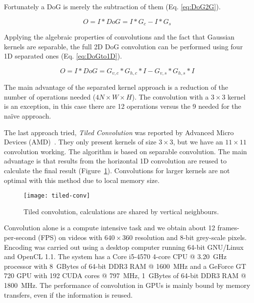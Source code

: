 Fortunately a DoG is merely the subtraction of them (Eq. \ref{eq:DoG2G}).
\vspace*{0.5cm}

\begin{equation}
O = I \ast DoG = I \ast G_{c} - I \ast G_{s}
\label{eq:DoG2G}
\end{equation}

Applying the algebraic properties of convolutions and the fact that Gaussian kernels are separable, the full 2D DoG convolution can be performed using four 1D separated ones (Eq. \ref{eq:DoGto1D}).

\begin{equation}
O = I \ast DoG = G_{v,c} \ast G_{h,c} \ast I - G_{v,s} \ast G_{h,s} \ast I 
\label{eq:DoGto1D}
\end{equation}

The main advantage of the separated kernel approach is a reduction of the number of operations needed ($4N\times W \times H$). The convolution with a $3\times 3$ kernel is an exception, in this case there are 12 operations versus the 9 needed for the naïve approach.


The last approach tried, \emph{Tiled Convolution} was reported by Advanced Micro Devices (AMD)~\cite{tiled-convolution}. They only present kernels of size $3\times3$, but we have an $11\times11$ convolution working. The algorithm is based on separable convolution. The main advantage is that results from the horizontal 1D convolution are reused to calculate the final result (Figure~\ref{fig:c2s:tiled-conv}). Convolutions for larger kernels are not optimal with this method due to local memory size.

\begin{figure}[h]
  \begin{center}
    \texttt{[image: tiled-conv]}
    \caption{Tiled convolution, calculations are shared by vertical neighbours.}
    \label{fig:c2s:tiled-conv}
  \end{center}
\end{figure}

Convolution alone is a compute intensive task and we obtain about 12 frames-per-second (FPS) on videos with $640\times360$ resolution and 8-bit grey-scale pixels. Encoding was carried out using a desktop computer running 64-bit GNU/Linux and OpenCL 1.1. The system has a Core i5-4570 4-core CPU @ 3.20~GHz processor with 8~GBytes of 64-bit DDR3 RAM @ 1600~MHz and a GeForce GT 720 GPU with 192 CUDA cores @ 797~MHz, 1~GBytes of 64-bit DDR3 RAM @ 1800~MHz. The performance of convolution in GPUs is mainly bound by memory transfers, even if the information is reused. %

